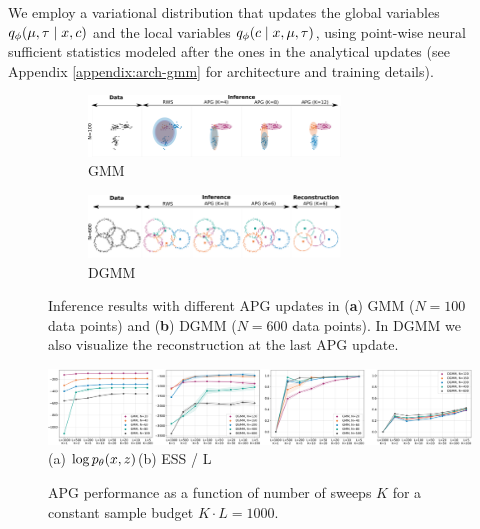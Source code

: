 \documentclass[anonymous=false, %
               format=acmsmall, %
               review=true, %
               screen=true, %
               nonacm=true]{acmart}
\theoremstyle{definition}
\begin{document}
We employ a variational distribution that updates the global variables $q_\phi(\mu, \tau \mid x, c)$ and the local variables $q_\phi(c \mid x, \mu, \tau)$, using point-wise neural sufficient statistics modeled after the ones in the analytical updates (see Appendix \ref{appendix:arch-gmm} for architecture and training details). 
\begin{figure}[t!]
  \centering
  \begin{subfigure}[t]{0.5\textwidth}
  \includegraphics[width=67mm]{figures/gmm_samples_1dataset.pdf}
  \vspace*{-1mm}
  \caption{GMM}
  \label{samples-gmm}
  \vspace{-1ex}
  \end{subfigure}%
  \begin{subfigure}[t]{0.5\textwidth}
  \includegraphics[width=67mm]{figures/dgmm_samples_1dataset.pdf}
  \vspace*{-1mm}
  \caption{DGMM}
  \label{samples-dgmm}
  \vspace{-1ex}
  \end{subfigure}
  \caption{Inference results with different APG updates in (\textbf{a}) GMM ($N=100$ data points) and (\textbf{b}) DGMM ($N=600$ data points). In DGMM we also visualize the reconstruction at the last APG update.}
  \label{samples-mixture}
\end{figure}
\begin{figure}[t!]
  \centering
  \includegraphics[width=1.0\linewidth]{figures/both-budget-dot-v2.pdf}
  \vspace*{-3.5mm}
  {\small \hspace{1em}(a) $\log p_\theta(x, z)$\hspace{16em}(b) ESS / L}\\
  \caption{APG performance as a function of number of sweeps $K$ for a constant sample budget $K \cdot L = 1000$.}
  \label{fig:budget}
\end{figure}
\end{document}
